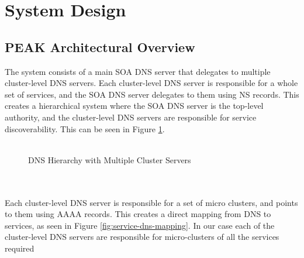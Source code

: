 \documentclass[12pt]{article}
\begin{document}
\section{System Design}
\subsection{PEAK Architectural Overview}
The system consists of a main SOA DNS server that delegates to multiple cluster-level DNS servers.
Each cluster-level DNS server is responsible for a whole set of services, and the SOA DNS server delegates to them using NS records.
This creates a hierarchical system where the SOA DNS server is the top-level authority, and the cluster-level DNS servers are responsible for service discoverability.
This can be seen in Figure \ref{fig:dns-hierarchy}.
\\
\\
\begin{figure}[h]
    \centering
    \caption{DNS Hierarchy with Multiple Cluster Servers}
    \label{fig:dns-hierarchy}
\end{figure}
\\
\\
Each cluster-level DNS server is responsible for a set of micro clusters, and points to them using AAAA records.
This creates a direct mapping from DNS to services, as seen in Figure \ref{fig:service-dns-mapping}.
In our case each of the cluster-level DNS servers are responsible for micro-clusters of all the services required 
\end{document}
